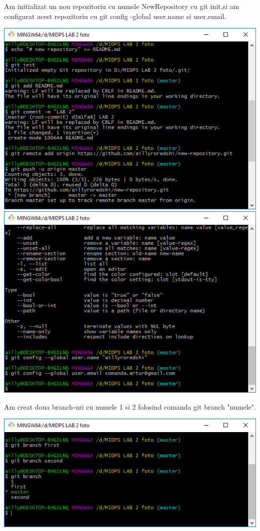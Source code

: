 Am initializat un nou repozitoriu cu numele NewRepository cu git init,si am configurat acest repozitoriu cu git config \--global user.name si user.email.\\
\begin{center}
\includegraphics[scale=0.75]{images/5}\\
\includegraphics[scale=0.75]{images/6}\\
\end{center}

Am creat doua branch-uri cu numele 1 si 2 folosind comanda git branch "numele".\\
\begin{center}
\includegraphics[scale=0.75]{images/7}\\
\end{center}

